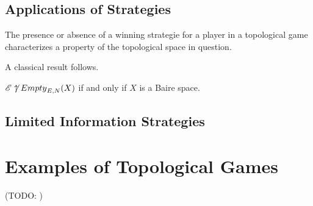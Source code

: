 \subsection{Applications of Strategies}

The presence or absence of a winning strategie for a player in a topological
game characterizes a property of the topological space in question.

A classical result follows.

\begin{thm}
$\mathscr{E}\not\uparrow {Empty}_{E,N}(X)$ if and only if $X$ is a Baire space. \cite{haworth}
\end{thm}



\subsection{Limited Information Strategies}


\section{Examples of Topological Games}

(TODO: )











